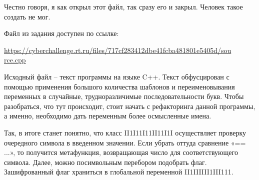 
Честно говоря, я как открыл этот файл, так сразу его и закрыл. Человек такое создать не мог.

Файл из задания доступен по ссылке:

\url{https://cyberchallenge.rt.ru/files/717cf283412dbe41fcba481801e5405d/sou}\\\url{rce.cpp}

\solutionSection

Исходный файл – текст программы на языке C++. Текст обфусцирован с помощью применения большого количества шаблонов и переименовывания переменных в случайные, трудноразличимые последовательности букв. Чтобы разобраться, что тут происходит, стоит начать с рефакторинга данной программы, а именно, необходимо дать переменным более осмысленные имена.

Так, в итоге станет понятно, что класс II1I11I11II11I1I осуществляет проверку очередного символа в введенном значении. Если убрать оттуда сравнение «== ...», то получится метафункция, возвращающая число для соответствующего символа. Далее, можно посимвольным перебором подобрать флаг. Зашифрованный флаг храниться в глобальной переменной II1IIIIII1III111.

